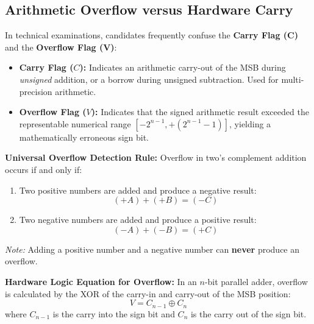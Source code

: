 \subsection{Arithmetic Overflow versus Hardware Carry}
In technical examinations, candidates frequently confuse the \textbf{Carry Flag (C)} and the \textbf{Overflow Flag (V)}:

\begin{itemize}
    \item \textbf{Carry Flag ($C$):} Indicates an arithmetic carry-out of the MSB during \textit{unsigned} addition, or a borrow during unsigned subtraction. Used for multi-precision arithmetic.
    \item \textbf{Overflow Flag ($V$):} Indicates that the signed arithmetic result exceeded the representable numerical range $[-2^{n-1}, +(2^{n-1}-1)]$, yielding a mathematically erroneous sign bit.
\end{itemize}

\textbf{Universal Overflow Detection Rule:} Overflow in two's complement addition occurs if and only if:
\begin{enumerate}[label=\bfseries\alph*.]
    \item Two positive numbers are added and produce a negative result:
    \[ (+A) + (+B) = (-C) \]
    \item Two negative numbers are added and produce a positive result:
    \[ (-A) + (-B) = (+C) \]
\end{enumerate}
\textit{Note:} Adding a positive number and a negative number can \textbf{never} produce an overflow.

\textbf{Hardware Logic Equation for Overflow:}
In an $n$-bit parallel adder, overflow is calculated by the XOR of the carry-in and carry-out of the MSB position:
\begin{equation}
\label{eq:overflow_xor}
V = C_{n-1} \oplus C_{n}
\end{equation}
where $C_{n-1}$ is the carry into the sign bit and $C_n$ is the carry out of the sign bit.

